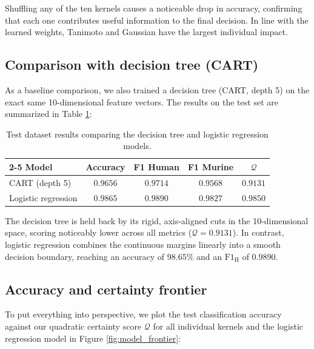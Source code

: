 Shuffling any of the ten kernels causes a noticeable drop in accuracy, confirming that each one contributes useful information to the final decision. In line with the learned weights, Tanimoto and Gaussian have the largest individual impact.

\subsection{Comparison with decision tree (CART)}

As a baseline comparison, we also trained a decision tree (CART, depth 5) on the exact same 10-dimensional feature vectors. The results on the test set are summarized in Table \ref{tab:logreg_comparison}:

\begin{table}[H]
    \centering
    \renewcommand{\arraystretch}{1.5}
    \begin{tabular}{lcccc} \cline{2-5}
        Model & Accuracy & F1 Human & F1 Murine & $\mathcal Q$ \\ \hline \hline
        CART (depth 5) & $0.9656$ & $0.9714$ & $0.9568$ & $0.9131$ \\ \hline
        Logistic regression & $0.9865$ & $0.9890$ & $0.9827$ & $0.9850$ \\ \hline
    \end{tabular}
    \caption{Test dataset results comparing the decision tree and logistic regression models.}
    \label{tab:logreg_comparison}
\end{table}

The decision tree is held back by its rigid, axis-aligned cuts in the 10-dimensional space, scoring noticeably lower across all metrics ($\mathcal Q = 0.9131$). In contrast, logistic regression combines the continuous margins linearly into a smooth decision boundary, reaching an accuracy of $98.65\%$ and an $\text{F1}_\text{H}$ of $0.9890$.

\subsection{Accuracy and certainty frontier}

To put everything into perspective, we plot the test classification accuracy against our quadratic certainty score $\mathcal Q$ for all individual kernels and the logistic regression model in Figure \ref{fig:model_frontier}:\futnotetext{}

